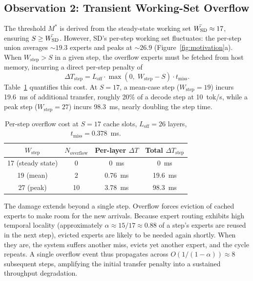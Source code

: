 \subsection{Observation 2: Transient Working-Set Overflow}
\label{subsec:obs2}

The threshold $M^*$ is derived from the steady-state working set $\bar{W_{\mathrm{SD}}}\approx 17$, ensuring $S \ge \bar{W_{\mathrm{SD}}}$. However, SD's per-step working set fluctuates: the per-step union averages ${\sim}19.3$ experts and peaks at ${\sim}26.9$ (Figure~\ref{fig:motivation}a). When $W_{\mathrm{step}} > S$ in a given step, the overflow experts must be fetched from host memory, incurring a direct per-step penalty of
\begin{equation}
\label{eq:overflow}
\Delta T_{\mathrm{step}} = L_{\mathrm{off}} \cdot \max(0,\; W_{\mathrm{step}} - S) \cdot t_{\mathrm{miss}}.
\end{equation}
Table~\ref{tab:overflow} quantifies this cost. At $S=17$, a mean-case step ($W_{\mathrm{step}}=19$) incurs 19.6~ms of additional transfer, roughly 20\% of a decode step at 10~tok/s, while a peak step ($W_{\mathrm{step}}=27$) incurs 98.3~ms, nearly doubling the step time.

\begin{table}[t]
\caption{Per-step overflow cost at $S=17$ cache slots, $L_{\mathrm{off}}=26$ layers, $t_{\mathrm{miss}}=0.378$~ms.}
\label{tab:overflow}
\centering
\small
\begin{tabular}{cccc}
\toprule
$W_{\mathrm{step}}$ & $N_{\mathrm{overflow}}$ & Per-layer $\Delta T$ & Total $\Delta T_{\mathrm{step}}$ \\
\midrule
17 (steady state) & 0 & 0~ms & 0~ms \\
19 (mean) & 2 & 0.76~ms & 19.6~ms \\
27 (peak) & 10 & 3.78~ms & 98.3~ms \\
\bottomrule
\end{tabular}
\end{table}

The damage extends beyond a single step. Overflow forces eviction of cached experts to make room for the new arrivals. Because expert routing exhibits high temporal locality (approximately $\alpha \approx 15/17 \approx 0.88$ of a step's experts are reused in the next step), evicted experts are likely to be needed again shortly. When they are, the system suffers another miss, evicts yet another expert, and the cycle repeats. A single overflow event thus propagates across $O(1/(1-\alpha)) \approx 8$ subsequent steps, amplifying the initial transfer penalty into a sustained throughput degradation.

